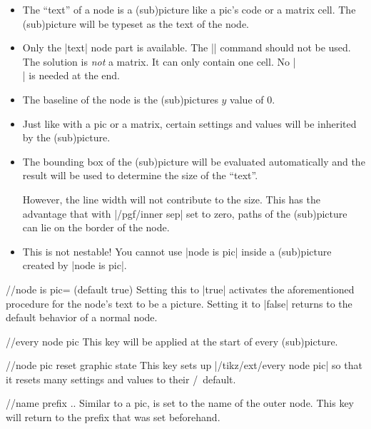 \begin{multicols}{2}
\begin{itemize}
\item The \enquote{text} of a node is a (sub)picture like a pic's code or a matrix cell.
      The (sub)picture will be typeset as the text of the node.
\item Only the |text| node part is available. The |\nodepart| command should not be used.
      The solution is \emph{not} a matrix. It can only contain one cell. No |\\| is needed at the end.
\item The baseline of the node is the (sub)pictures $y$ value of $0$.
\item Just like with a pic or a matrix, certain settings and values will be inherited by the (sub)picture.
\item The bounding box of the (sub)picture will be evaluated automatically and the result will be used to determine
      the size of the \enquote{text}.

      However, the line width will not contribute to the size.
      This has the advantage that with |/pgf/inner sep| set to zero, paths of the (sub)picture
      can lie on the border of the node.
\item This is not nestable!
      You cannot use |node is pic| inside a (sub)picture created by |node is pic|.
\end{itemize}

\newcolumn
\begin{key}{/\tikzext/node is pic= (default true)}
  Setting this to |true| activates the aforementioned procedure for the node's text to be a picture.
  Setting it to |false| returns to the default behavior of a normal node.
\end{key}
\begin{stylekey}{/\tikzext/every node pic}
This key will be applied at the start of every (sub)picture.
\end{stylekey}
\begin{key}{/\tikzext/node pic reset graphic state}
This key sets up |/tikz/ext/every node pic| so that it resets many settings and values
to their \pgfname/\tikzname\ default.
\end{key}

\begin{key}{/\tikzext/name prefix ..}
  Similar to a pic,  is set to the name of the outer node.
  This key will return to the prefix that was set beforehand.
\end{key}
\begin{codeexample}[preamble=\usetikzlibrary{ext.nodes}]
\end{codeexample}
\newcolumn


\end{multicols}
